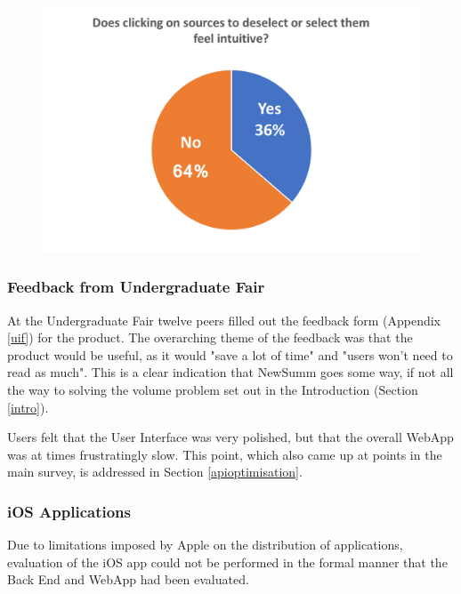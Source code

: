 \documentclass[12pt]{article}
\begin{document}
\begin{figure}[ht!]
  \centering
    \includegraphics[scale=0.6]{ui7.png}
   \caption[A graph depicting responses to the User Interface Survey]{}
   \label{ui7}
\end{figure} 

\subsubsection{Feedback from Undergraduate Fair}

\label{uifeedback}

At the Undergraduate Fair twelve peers filled out the feedback form (Appendix \ref{uif}) for the product. The overarching theme of the feedback was that the product would be useful, as it would "save a lot of time" and "users won't need to read as much". This is a clear indication that NewSumm goes some way, if not all the way to solving the volume problem set out in the Introduction (Section \ref{intro}).

Users felt that the User Interface was very polished, but that the overall WebApp was at times frustratingly slow. This point, which also came up at points in the main survey, is addressed in Section \ref{apioptimisation}.

\subsubsection{iOS Applications}

Due to limitations imposed by Apple on the distribution of applications, evaluation of the iOS app could not be performed in the formal manner that the Back End and WebApp had been evaluated. 
\end{document}
